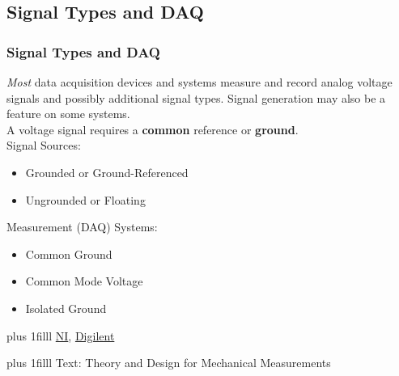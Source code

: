 \documentclass[fleqn]{beamer} %
\newcommand{\sectionIIsubsectionItitle}{Signal Types and DAQ}
\newcommand{\btVFill}{\vskip0pt plus 1filll}
\begin{document}
		\subsection{\sectionIIsubsectionItitle}\label{sectionIIsubsectionI}

			\begin{frame}[label=sectionIIsubsectionI]
				\frametitle{\sectionIIsubsectionItitle} \scriptsize

				\bigskip	

				{\it Most} data acquisition devices and systems measure and record {\BL analog} voltage signals and possibly additional signal types. Signal {\GR generation} may also be a feature on some systems. \vspace{5mm}\\

				A voltage signal requires a {\bf common} reference or {\bf ground}.	\vspace{2mm}\\

				Signal Sources:
				\begin{itemize}
					\item Grounded or Ground-Referenced	\vspace{2mm}\\

					\item Ungrounded or Floating \vspace{2mm}\\		

				\end{itemize}	
				\vspace*{5mm}

				Measurement (DAQ) Systems:
				\begin{itemize}
					\item Common Ground \vspace{2mm}\\

					\item Common Mode Voltage \vspace{2mm}\\

					\item Isolated Ground \vspace{2mm}\\

				\end{itemize}
				

				\btVFill
				\tiny{\href{https://www.ni.com/en/support/documentation/supplemental/06/grounding-considerations---intermediate-analog-concepts.html}{NI},}
				\tiny{\href{https://digilent.com/reference/daq-and-datalogging/documents/analog-input-signal-connections-1}{Digilent}}

				\btVFill
				\tiny{Text: Theory and Design for Mechanical Measurements}
		
			\end{frame}
\end{document}

